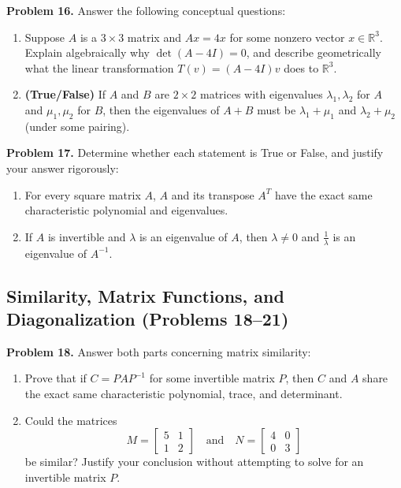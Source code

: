 \documentclass[11pt, letterpaper]{article}
\theoremstyle{definition}
\theoremstyle{remark}
\begin{document}
\noindent\textbf{Problem 16.} Answer the following conceptual questions:
\begin{enumerate}[label=(\alph*), topsep=3pt, itemsep=3pt]
    \item Suppose $A$ is a $3 \times 3$ matrix and $Ax = 4x$ for some nonzero vector $x \in \mathbb{R}^3$. Explain algebraically why $\det(A - 4I) = 0$, and describe geometrically what the linear transformation $T(v) = (A - 4I)v$ does to $\mathbb{R}^3$.
    \item \textbf{(True/False)} If $A$ and $B$ are $2 \times 2$ matrices with eigenvalues $\lambda_1, \lambda_2$ for $A$ and $\mu_1, \mu_2$ for $B$, then the eigenvalues of $A + B$ must be $\lambda_1 + \mu_1$ and $\lambda_2 + \mu_2$ (under some pairing).
\end{enumerate}

\noindent\textbf{Problem 17.} Determine whether each statement is True or False, and justify your answer rigorously:
\begin{enumerate}[label=(\alph*), topsep=3pt, itemsep=3pt]
    \item For every square matrix $A$, $A$ and its transpose $A^T$ have the exact same characteristic polynomial and eigenvalues.
    \item If $A$ is invertible and $\lambda$ is an eigenvalue of $A$, then $\lambda \neq 0$ and $\frac{1}{\lambda}$ is an eigenvalue of $A^{-1}$.
\end{enumerate}

\subsection{Similarity, Matrix Functions, and Diagonalization (Problems 18--21)}

\noindent\textbf{Problem 18.} Answer both parts concerning matrix similarity:
\begin{enumerate}[label=(\alph*), topsep=3pt, itemsep=3pt]
    \item Prove that if $C = PAP^{-1}$ for some invertible matrix $P$, then $C$ and $A$ share the exact same characteristic polynomial, trace, and determinant.
    \item Could the matrices
    \[
    M = \begin{bmatrix} 5 & 1 \\ 1 & 2 \end{bmatrix} \quad \text{and} \quad N = \begin{bmatrix} 4 & 0 \\ 0 & 3 \end{bmatrix}
    \]
    be similar? Justify your conclusion without attempting to solve for an invertible matrix $P$.
\end{enumerate}
\end{document}
